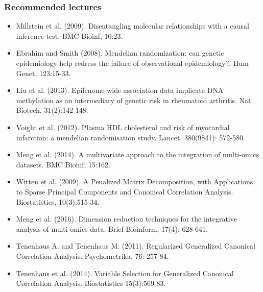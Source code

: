 \documentclass[10pt,xcolor=dvipsnames]{beamer}\usepackage[]{graphicx}\usepackage[]{color}
\begin{document}
\begin{frame}[plain]\frametitle{Recommended lectures}

\footnotesize

\begin{itemize}
\item Millstein et al. (2009). Disentangling molecular relationships with a causal inference test. BMC Bioinf, 10:23.
\item Ebrahim and Smith (2008). Mendelian randomization: can genetic epidemiology help redress the failure of observational epidemiology?. Hum Genet, 123:15-33.
\item Liu et al. (2013). Epifenome-wide association data implicate DNA methylation as an intermediary of genetic risk in rheumatoid arthritis. Nat Biotech, 31(2):142-148.
\item Voight et al. (2012). Plasma HDL cholesterol and risk of myocardial infarction: a mendelian randomisation study. Lancet, 380(9841): 572-580.
\item Meng et al. (2014). A multivariate approach to the integration of multi-omics datasets. BMC Bioinf, 15:162.
\item Witten et al. (2009). A Penalized Matrix Decomposition, with Applications to Sparse Principal Components and Canonical Correlation Analysis. Biostatistics, 10(3):515-34.
\item Meng et al. (2016). Dimension reduction techniques for the integrative analysis of multi-omics data. Brief Bioinform, 17(4): 628-641.
\item Tenenhaus A. and Tenenhaus M. (2011). Regularized Generalized Canonical Correlation Analysis. Psychometrika, 76: 257-84.
\item Tenenhaus et al. (2014).  Variable Selection for Generalized Canonical Correlation Analysis. Biostatistics 15(3):569-83.
\end{itemize}
\end{frame}
\end{document}
